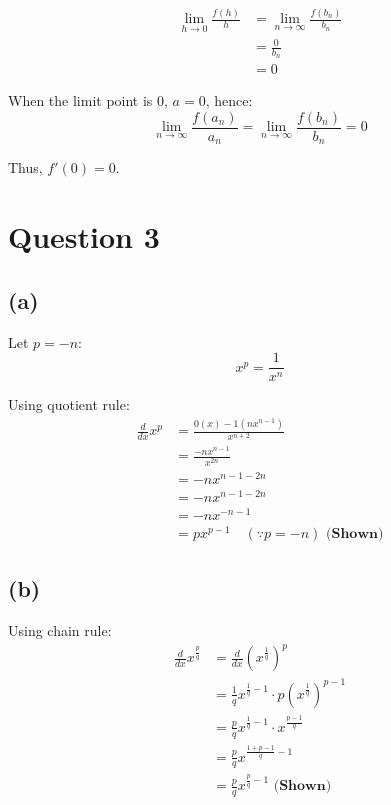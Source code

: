 \documentclass[11pt]{article}
\begin{document}
\begin{align*}
\lim_{h \rightarrow 0} \frac{f(h)}{h} &= \lim_{n \rightarrow \infty} \frac{f(b_n)}{b_n} \\
&= \frac{0}{b_n} \\
&= 0
\end{align*}

When the limit point is \(0\), \(a = 0\), hence:
\[\lim_{n \rightarrow \infty} \frac{f(a_n)}{a_n} = \lim_{n \rightarrow \infty} \frac{f(b_n)}{b_n} = 0\]

Thus, \(f'(0) = 0\).

\newpage

\section{Question 3}
\label{sec:org4f59aeb}

\subsection{(a)}
\label{sec:org177d77d}

Let \(p = -n\):
\[x^p = \frac{1}{x^n}\]

Using quotient rule:
\begin{align*}
\frac{d}{dx} x^p &= \frac{0(x) - 1(nx^{n-1})}{x^{n+2}} \\
&= \frac{-nx^{n-1}}{x^{2n}} \\
&= -nx^{n-1 - 2n} \\
&= -nx^{n - 1 - 2n} \\
&= -nx^{-n - 1} \\
&= px^{p - 1} \quad (\because p = -n) \textbf{ (Shown)}
\end{align*}

\subsection{(b)}
\label{sec:org66fb51c}

Using chain rule:
\begin{align*}
\frac{d}{dx} x^{\frac{p}{q}} &= \frac{d}{dx} \left( x^{\frac{1}{q}} \right)^p \\
&= \frac{1}{q} x^{\frac{1}{q} - 1} \cdot p \left(x^{\frac{1}{q}} \right)^{p - 1} \\
&= \frac{p}{q} x^{\frac{1}{q} - 1} \cdot x^{\frac{p - 1}{q}} \\
&= \frac{p}{q} x^{\frac{1 + p - 1}{q} - 1} \\
&= \frac{p}{q} x^{\frac{p}{q} - 1} \textbf{ (Shown)}
\end{align*}
\end{document}
